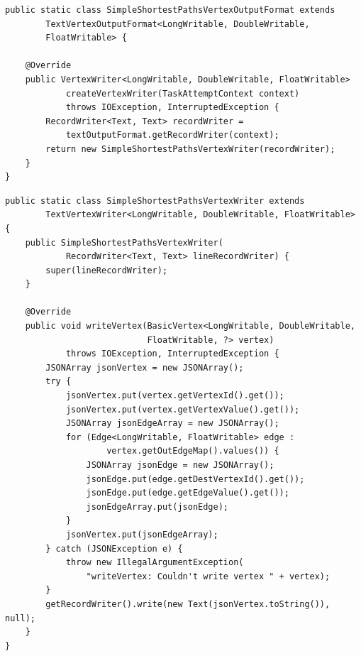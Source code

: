 \begin{lstlisting}[float]
public static class SimpleShortestPathsVertexOutputFormat extends
        TextVertexOutputFormat<LongWritable, DoubleWritable,
        FloatWritable> {

    @Override
    public VertexWriter<LongWritable, DoubleWritable, FloatWritable>
            createVertexWriter(TaskAttemptContext context)
            throws IOException, InterruptedException {
        RecordWriter<Text, Text> recordWriter =
            textOutputFormat.getRecordWriter(context);
        return new SimpleShortestPathsVertexWriter(recordWriter);
    }
}
\end{lstlisting}

\begin{lstlisting}[float]
public static class SimpleShortestPathsVertexWriter extends
        TextVertexWriter<LongWritable, DoubleWritable, FloatWritable> {
    public SimpleShortestPathsVertexWriter(
            RecordWriter<Text, Text> lineRecordWriter) {
        super(lineRecordWriter);
    }

    @Override
    public void writeVertex(BasicVertex<LongWritable, DoubleWritable,
                            FloatWritable, ?> vertex)
            throws IOException, InterruptedException {
        JSONArray jsonVertex = new JSONArray();
        try {
            jsonVertex.put(vertex.getVertexId().get());
            jsonVertex.put(vertex.getVertexValue().get());
            JSONArray jsonEdgeArray = new JSONArray();
            for (Edge<LongWritable, FloatWritable> edge :
                    vertex.getOutEdgeMap().values()) {
                JSONArray jsonEdge = new JSONArray();
                jsonEdge.put(edge.getDestVertexId().get());
                jsonEdge.put(edge.getEdgeValue().get());
                jsonEdgeArray.put(jsonEdge);
            }
            jsonVertex.put(jsonEdgeArray);
        } catch (JSONException e) {
            throw new IllegalArgumentException(
                "writeVertex: Couldn't write vertex " + vertex);
        }
        getRecordWriter().write(new Text(jsonVertex.toString()), null);
    }
}
\end{lstlisting}